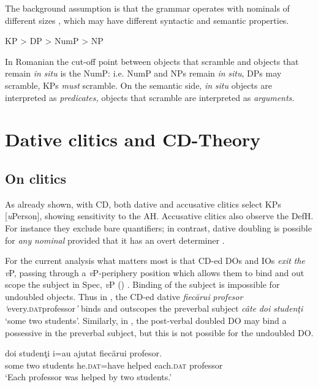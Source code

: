 \documentclass[output=paper,modfonts,nonflat,newtxmath]{langsci/langscibook}
\begin{document}
The background assumption is that the grammar operates with nominals of different sizes , which may have different syntactic and semantic properties. 

\ea%
      \label{ex:cornilescu:22}
        KP   >   DP   > NumP   > NP
      
      \z

             
In Romanian the cut-off point between objects that scramble and objects that remain \textit{in} \textit{situ} is the NumP: i.e. NumP and NPs remain \textit{in} \textit{situ}, DPs may scramble, KPs \textit{must} scramble. On the semantic side, \textit{in} \textit{situ} objects are interpreted as \textit{predicates,} objects that scramble are interpreted as \textit{arguments.}

\section{Dative clitics and CD-Theory} %

\subsection{{On} {clitics}}

As already shown, with CD, both dative and accusative clitics select KPs [\textit{u}Person], showing sensitivity to the AH. Accusative clitics also observe the DefH. For instance they exclude bare quantifiers; in contrast, dative doubling is possible for \textit{any} \textit{nominal} provided that it has an overt determiner \citep{Cornilescu2017}.

For the current analysis what matters most is that CD-ed DOs and IOs \textit{exit} \textit{the} \textit{v}P, passing through a \textit{v}P-periphery position which allows them to bind and out scope the subject in Spec, \textit{v}P (\citealt{Dobrovie-Sorin1994, CornilescuDinuTigău2017DOC}) . Binding of the subject is impossible for undoubled objects. Thus in , the CD-ed dative \textit{fiecărui} \textit{profesor} \textit{‘}every.\textsc{dat}professor\textit{’} binds and outscopes the preverbal subject \textit{câte} \textit{doi} \textit{studenţi} ‘some two students’. Similarly, in , the post-verbal doubled DO may bind a possessive in the preverbal subject, but this is not possible for the undoubled DO. 

\ea%
      \label{ex:cornilescu:23}
       {doi} {studenţi} {i=au}  {ajutat} {fiecărui} {profesor}.\\
            some two students he.\textsc{dat}=have helped each.\textsc{dat} professor\\
      \glt ‘Each professor was helped by two students.’
      \z
\end{document}
